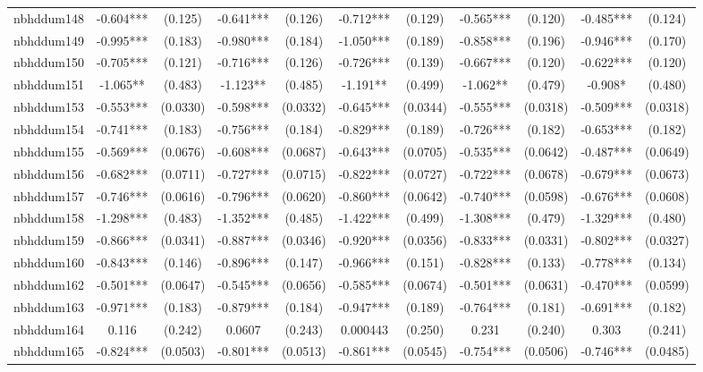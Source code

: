 \documentclass[]{article}
\begin{document}
\begin{tabular}{lcccccccccc}
nbhddum148 & -0.604*** & (0.125) & -0.641*** & (0.126) & -0.712*** & (0.129) & -0.565*** & (0.120) & -0.485*** & (0.124) \\
nbhddum149 & -0.995*** & (0.183) & -0.980*** & (0.184) & -1.050*** & (0.189) & -0.858*** & (0.196) & -0.946*** & (0.170) \\
nbhddum150 & -0.705*** & (0.121) & -0.716*** & (0.126) & -0.726*** & (0.139) & -0.667*** & (0.120) & -0.622*** & (0.120) \\
nbhddum151 & -1.065** & (0.483) & -1.123** & (0.485) & -1.191** & (0.499) & -1.062** & (0.479) & -0.908* & (0.480) \\
nbhddum153 & -0.553*** & (0.0330) & -0.598*** & (0.0332) & -0.645*** & (0.0344) & -0.555*** & (0.0318) & -0.509*** & (0.0318) \\
nbhddum154 & -0.741*** & (0.183) & -0.756*** & (0.184) & -0.829*** & (0.189) & -0.726*** & (0.182) & -0.653*** & (0.182) \\
nbhddum155 & -0.569*** & (0.0676) & -0.608*** & (0.0687) & -0.643*** & (0.0705) & -0.535*** & (0.0642) & -0.487*** & (0.0649) \\
nbhddum156 & -0.682*** & (0.0711) & -0.727*** & (0.0715) & -0.822*** & (0.0727) & -0.722*** & (0.0678) & -0.679*** & (0.0673) \\
nbhddum157 & -0.746*** & (0.0616) & -0.796*** & (0.0620) & -0.860*** & (0.0642) & -0.740*** & (0.0598) & -0.676*** & (0.0608) \\
nbhddum158 & -1.298*** & (0.483) & -1.352*** & (0.485) & -1.422*** & (0.499) & -1.308*** & (0.479) & -1.329*** & (0.480) \\
nbhddum159 & -0.866*** & (0.0341) & -0.887*** & (0.0346) & -0.920*** & (0.0356) & -0.833*** & (0.0331) & -0.802*** & (0.0327) \\
nbhddum160 & -0.843*** & (0.146) & -0.896*** & (0.147) & -0.966*** & (0.151) & -0.828*** & (0.133) & -0.778*** & (0.134) \\
nbhddum162 & -0.501*** & (0.0647) & -0.545*** & (0.0656) & -0.585*** & (0.0674) & -0.501*** & (0.0631) & -0.470*** & (0.0599) \\
nbhddum163 & -0.971*** & (0.183) & -0.879*** & (0.184) & -0.947*** & (0.189) & -0.764*** & (0.181) & -0.691*** & (0.182) \\
nbhddum164 & 0.116 & (0.242) & 0.0607 & (0.243) & 0.000443 & (0.250) & 0.231 & (0.240) & 0.303 & (0.241) \\
nbhddum165 & -0.824*** & (0.0503) & -0.801*** & (0.0513) & -0.861*** & (0.0545) & -0.754*** & (0.0506) & -0.746*** & (0.0485) \\

\end{tabular}
\end{document}
